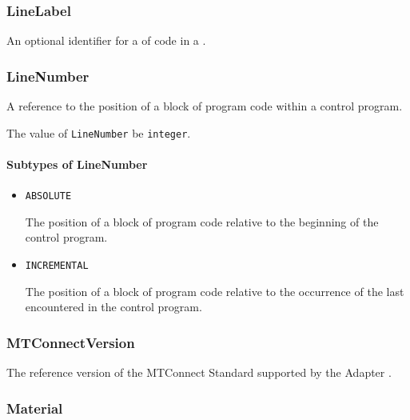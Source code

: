 \subsubsection{LineLabel}
\label{sec:LineLabel}



An optional identifier for a  of code in a .



\subsubsection{LineNumber}
\label{sec:LineNumber}



A reference to the position of a block of program code within a control program.


The value of \texttt{LineNumber} \MUST be \texttt{integer}.


\paragraph{Subtypes of LineNumber}\mbox{}
\label{sec:Subtypes of LineNumber}

\begin{itemize}

\item \texttt{ABSOLUTE}


The position of a block of program code relative to the beginning of the control program.

\item \texttt{INCREMENTAL}


The position of a block of program code relative to the occurrence of the last  encountered in the control program.


\end{itemize}





\subsubsection{MTConnectVersion}
\label{sec:MTConnectVersion}



The reference version of the MTConnect Standard supported by the \gls{Adapter}
.



\subsubsection{Material}
\label{sec:Material}



